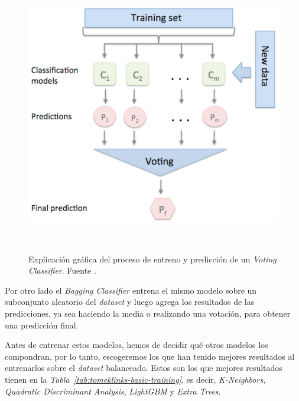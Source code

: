 \begin{figure}[!h]
    \centering
    \includegraphics[width=0.7\linewidth]{media/images/majority_voting.png}
    \caption{Explicación gráfica del proceso de entreno y predicción de un \textit{Voting Classifier}. Fuente \cite{Ensemble96:online}.}\ \label{fig:voting-classifiers}
\end{figure}

Por otro lado el \textit{Bagging Classifier} entrena el mismo modelo sobre un subconjunto aleatorio del \textit{dataset} y luego agrega los resultados de las predicciones, ya sea haciendo la media o realizando una votación, para obtener una predicción final.\ \cite{sklearne53:online}


Antes de entrenar estos modelos, hemos de decidir qué otros modelos los compondran, por lo tanto, escogeremos los que han tenido mejores resultados al entrenarlos sobre el \textit{dataset} balanceado. Estos son los que mejores resultados tienen en la \textit{Tabla\ \ref{tab:tomeklinks-basic-training}}, es decir, \textit{K-Neighbors}, \textit{Quadratic Discriminant Analysis}, \textit{LightGBM} y \textit{Extra Trees}.

